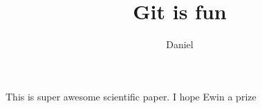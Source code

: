 \documentclass[10pt]{article}
\author{Daniel}
\title{Git is fun}
\begin{document}
	\maketitle

	This is super awesome scientific paper.
	I hope Ewin a prize
\end{document}
